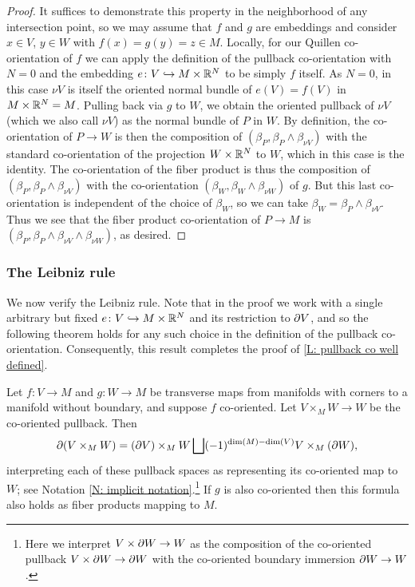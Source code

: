 \begin{proof}
	It suffices to demonstrate this property in the neighborhood of any intersection point, so we may assume that $f$ and $g$ are embeddings and consider $x \in V$, $y \in W$ with $f(x) = g(y) = z \in M$.
	Locally, for our Quillen co-orientation of $f$ we can apply the definition of the pullback co-orientation with $N = 0$ and the embedding $e \colon V \hookrightarrow M \times \mathbb{R}^N$ to be simply $f$ itself.
	As $N = 0$, in this case $\nu V$ is itself the oriented normal bundle of $e(V) = f(V)$ in $M \times \mathbb{R}^N = M$.
	Pulling back via $g$ to $W$, we obtain the oriented pullback of $\nu V$ (which we also call $\nu V$) as the normal bundle of $P$ in $W$.
	By definition, the co-orientation of $P \to W$ is then the composition of $(\beta_P,\beta_P \wedge \beta_{\nu V})$ with the standard co-orientation of the projection $W \times \mathbb{R}^N$ to $W$, which in this case is the identity.
	The co-orientation of the fiber product is thus the composition of $(\beta_P,\beta_P \wedge \beta_{\nu V})$ with the co-orientation $(\beta_W, \beta_W \wedge \beta_{\nu W})$ of $g$.
	But this last co-orientation is independent of the choice of $\beta_W$, so we can take $\beta_W = \beta_P \wedge \beta_{\nu V}$.
	Thus we see that the fiber product co-orientation of $P \to M$ is $(\beta_P, \beta_P \wedge \beta_{\nu V} \wedge \beta_{\nu W})$, as desired.
\end{proof}

\subsubsection{The Leibniz rule}

We now verify the Leibniz rule.
Note that in the proof we work with a single arbitrary but fixed $e \colon V \hookrightarrow M \times \mathbb{R}^N$ and its restriction to $\partial V$, and so the following theorem holds for any such choice in the definition of the pullback co-orientation.
Consequently, this result completes the proof of \cref{L: pullback co well defined}.

\begin{proposition}\label{leibniz}
	Let $f \colon V \to M$ and $g \colon W \to M$ be transverse maps from manifolds with corners to a manifold without boundary, and suppose $f$ co-oriented.
	Let $V \times_M W \to W$ be the co-oriented pullback.
	Then
	$$\partial (V \times_M W) = (\partial V) \times_M W \bigsqcup (-1)^{\dim(M)-\dim(V)} V \times_M (\partial W),$$
	interpreting each of these pullback spaces as representing its co-oriented map to $W$; see Notation \ref{N: implicit notation}.\footnote{Here we interpret $V \times \partial W \to W$ as the composition of the co-oriented pullback $V \times \partial W \to \partial W$ with the co-oriented boundary immersion $\partial W \to W$.} If $g$ is also co-oriented then this formula also holds as fiber products mapping to $M$.
\end{proposition}

